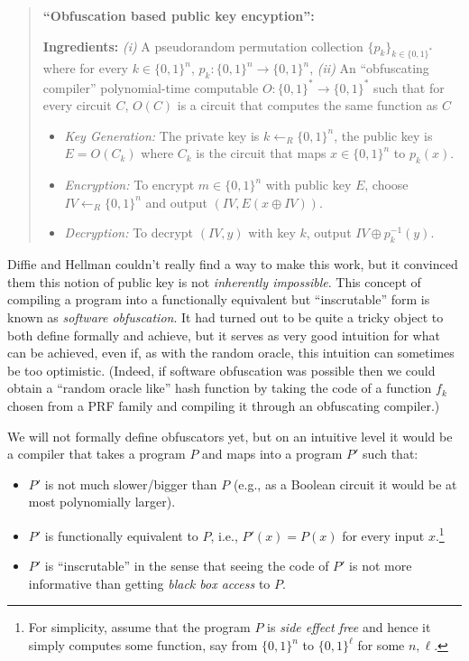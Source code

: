 \begin{quote}
\textbf{``Obfuscation based public key encyption'':}

\textbf{Ingredients:} \emph{(i)} A pseudorandom permutation collection
\(\{ p_k \}_{k\in \{0,1\}^*}\) where for every \(k\in \{0,1\}^n\),
\(p_k:\{0,1\}^n \rightarrow \{0,1\}^n\), \emph{(ii)} An ``obfuscating
compiler'' polynomial-time computable
\(O:\{0,1\}^* \rightarrow \{0,1\}^*\) such that for every circuit \(C\),
\(O(C)\) is a circuit that computes the same function as \(C\)

\begin{itemize}
\item
  \emph{Key Generation:} The private key is
  \(k \leftarrow_R \{0,1\}^n\), the public key is \(E=O(C_k)\) where
  \(C_k\) is the circuit that maps \(x\in \{0,1\}^n\) to \(p_k(x)\).
\item
  \emph{Encryption:} To encrypt \(m\in \{0,1\}^n\) with public key
  \(E\), choose \(\ensuremath{\mathit{IV}} \leftarrow_R \{0,1\}^n\) and
  output
  \((\ensuremath{\mathit{IV}}, E(x \oplus \ensuremath{\mathit{IV}}))\).
\item
  \emph{Decryption:} To decrypt \((\ensuremath{\mathit{IV}},y)\) with
  key \(k\), output \(\ensuremath{\mathit{IV}} \oplus p_k^{-1}(y)\).
\end{itemize}
\end{quote}

Diffie and Hellman couldn't really find a way to make this work, but it
convinced them this notion of public key is not \emph{inherently
impossible}. This concept of compiling a program into a functionally
equivalent but ``inscrutable'' form is known as \emph{software
obfuscation}. It had turned out to be quite a tricky object to both
define formally and achieve, but it serves as very good intuition for
what can be achieved, even if, as with the random oracle, this intuition
can sometimes be too optimistic. (Indeed, if software obfuscation was
possible then we could obtain a ``random oracle like'' hash function by
taking the code of a function \(f_k\) chosen from a PRF family and
compiling it through an obfuscating compiler.)

We will not formally define obfuscators yet, but on an intuitive level
it would be a compiler that takes a program \(P\) and maps into a
program \(P'\) such that:

\begin{itemize}
\tightlist
\item
  \(P'\) is not much slower/bigger than \(P\) (e.g., as a Boolean
  circuit it would be at most polynomially larger).
\item
  \(P'\) is functionally equivalent to \(P\), i.e., \(P'(x)=P(x)\) for
  every input \(x\).\footnote{For simplicity, assume that the program
    \(P\) is \emph{side effect free} and hence it simply computes some
    function, say from \(\{0,1\}^n\) to \(\{0,1\}^\ell\) for some
    \(n,\ell\).}
\item
  \(P'\) is ``inscrutable'' in the sense that seeing the code of \(P'\)
  is not more informative than getting \emph{black box access} to \(P\).
\end{itemize}

